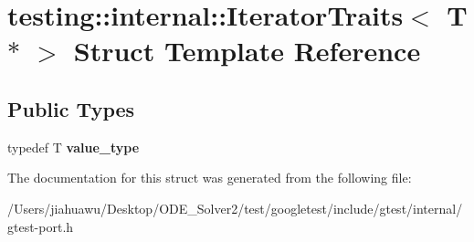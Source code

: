 \hypertarget{structtesting_1_1internal_1_1_iterator_traits_3_01_t_01_5_01_4}{}\section{testing\+:\+:internal\+:\+:Iterator\+Traits$<$ T $\ast$ $>$ Struct Template Reference}
\label{structtesting_1_1internal_1_1_iterator_traits_3_01_t_01_5_01_4}
\subsection*{Public Types}
\begin{DoxyCompactItemize}
\item 
\mbox{\label{structtesting_1_1internal_1_1_iterator_traits_3_01_t_01_5_01_4_a7e46869ed36cc5aea898e243d270a8be}} 
typedef T {\bfseries value\+\_\+type}
\end{DoxyCompactItemize}


The documentation for this struct was generated from the following file\+:\begin{DoxyCompactItemize}
\item 
/\+Users/jiahuawu/\+Desktop/\+O\+D\+E\+\_\+\+Solver2/test/googletest/include/gtest/internal/gtest-\/port.\+h\end{DoxyCompactItemize}
